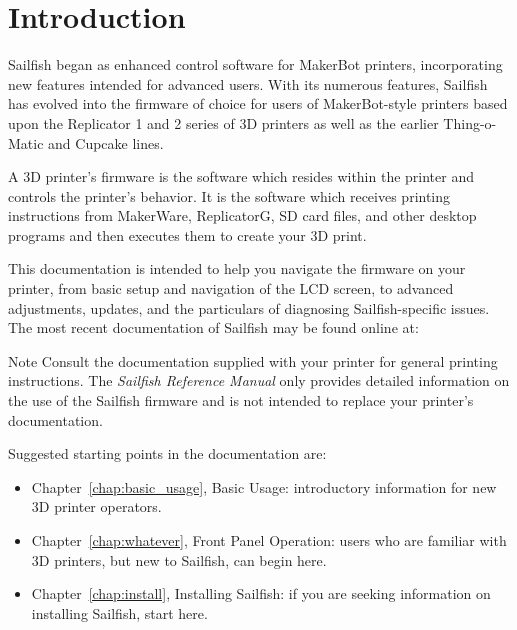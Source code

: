 \chapter{Introduction}

Sailfish began as enhanced control software for MakerBot printers,
incorporating new features intended for advanced users.  With its numerous
features, Sailfish has evolved into the firmware of choice for users of MakerBot-style printers based upon the Replicator 1 and 2 series
of 3D printers as well as the earlier Thing-o-Matic and Cupcake lines.

A 3D printer's firmware is the software which resides within the
printer and controls the printer's behavior. It is the software which
receives printing instructions from MakerWare, ReplicatorG, SD card
files, and other desktop programs and then executes them to create
your 3D print.

This documentation is intended to help you navigate the firmware on your printer, from basic setup and navigation of the \gls{LCD} screen, to advanced adjustments, updates, and the particulars of diagnosing Sailfish-specific issues.  The most recent documentation of Sailfish may be found online at:
\begin{quote}
\end{quote}

\begin{bclogo}[logo=\bcinfo, noborder=true, couleurBarre=yellow]{Note}
Consult the documentation supplied with your printer for general printing instructions.  The \emph{Sailfish Reference Manual} only provides detailed information on the use of the Sailfish \gls{firmware} and is not intended to replace your printer's documentation.  
\end{bclogo}

Suggested starting points in the documentation are:
\begin{itemize}
\item Chapter~\ref{chap:basic_usage}, Basic Usage: introductory information for new 3D printer operators.
\item Chapter~\ref{chap:whatever}, Front Panel Operation: users who are familiar with 3D printers, but new to Sailfish, can begin here.
\item Chapter~\ref{chap:install}, Installing Sailfish: if you are seeking information on installing Sailfish, start here.
\end{itemize}

